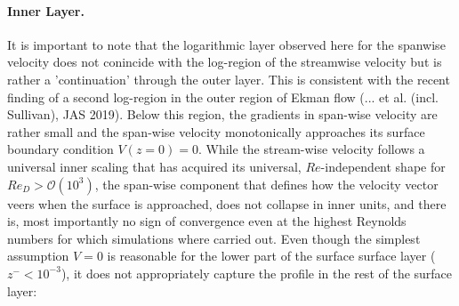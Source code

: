 \documentclass[a4paper,11pt]{amsart}
\begin{document}
\paragraph{Inner Layer.} It is important to note that the logarithmic layer observed here for the spanwise velocity does not
conincide with the log-region of the streamwise velocity but is rather a 'continuation' through the outer layer.
%
This is consistent with the recent finding of a second log-region in the outer region of Ekman flow
(... et al. (incl. Sullivan), JAS 2019).
%
Below this region, the gradients in span-wise velocity are rather small and the span-wise velocity
monotonically approaches its surface boundary condition $V(z=0)=0$.
%
While the stream-wise velocity follows a universal inner scaling that has acquired its universal, $Re$-independent shape for $Re_D> \mathcal{O}\left(10^3\right)$, the span-wise component that defines how the velocity vector veers when the surface is approached,
does not collapse in inner units, and there is, most importantly no sign of convergence even at the highest Reynolds numbers for
which simulations where carried out.
%
Even though the simplest assumption $V=0$ is reasonable for the lower part of the surface surface layer ($z^-<10^{-3}$), it does
not appropriately capture the profile in the rest of the surface layer:
\end{document}
